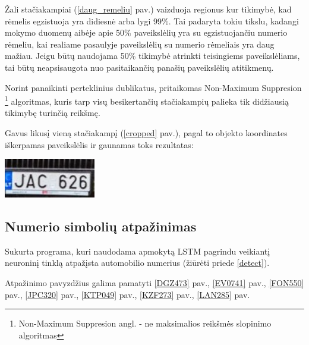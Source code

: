 \documentclass{VUMIFInfBakalaurinis}
\begin{document}
Žali stačiakampiai (\ref{daug_remeliu} pav.) vaizduoja regionus kur tikimybė, kad rėmelis egzistuoja yra didiesnė arba lygi 99\%.
Tai padaryta tokiu tikslu, kadangi mokymo duomenų aibėje apie 50\% paveikslėlių yra su egzistuojančiu numerio rėmeliu,
kai realiame pasaulyje paveikslėlių su numerio rėmeliais yra daug mažiau. Jeigu būtų naudojama 50\% tikimybė atrinkti 
teisingiems paveikslėliams, tai būtų neapsisaugota nuo pasitaikančių panašių paveikslėlių atitikmenų.

Norint panaikinti perteklinius dublikatus, pritaikomas 
Non-Maximum Suppresion \footnote{Non-Maximum Suppresion angl. - ne maksimalios reikšmės slopinimo algoritmas} algoritmas, kuris
tarp visų besikertančių stačiakampių palieka tik didžiausią tikimybę turinčią reikšmę\cite{girshick2014rich}.

Gavus likusį vieną stačiakampį (\ref{cropped} pav.), pagal to objekto koordinates iškerpamas paveikslėlis ir gaunamas toks rezultatas:

\begin{minipage}{\linewidth}
  \centering
  \includegraphics[width=4cm]{cropped_4.jpg}
  \label{cropped}
\end{minipage}



\subsection{Numerio simbolių atpažinimas}
Sukurta programa, kuri naudodama apmokytą LSTM pagrindu veikiantį neuroninį tinklą atpažįsta automobilio numerius (žiūrėti priede \ref{detect}).

Atpažinimo pavyzdžius galima pamatyti \ref{DGZ473} pav., \ref{EV0741} pav., \ref{FON550} pav., \ref{JPC320} pav., \ref{KTP049} pav., \ref{KZF273} pav., \ref{LAN285} pav.
\end{document}
